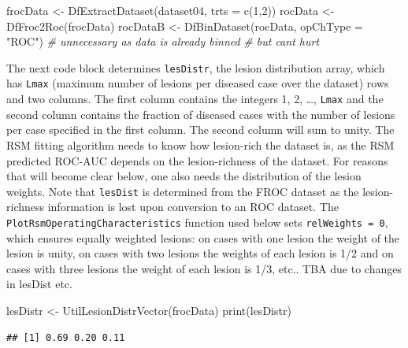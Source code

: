 \documentclass[
]{book}
\newenvironment{Shaded}{\begin{snugshade}}{\end{snugshade}}
\newcommand{\AttributeTok}[1]{\textcolor[rgb]{0.77,0.63,0.00}{#1}}
\newcommand{\CommentTok}[1]{\textcolor[rgb]{0.56,0.35,0.01}{\textit{#1}}}
\newcommand{\DecValTok}[1]{\textcolor[rgb]{0.00,0.00,0.81}{#1}}
\newcommand{\FunctionTok}[1]{\textcolor[rgb]{0.00,0.00,0.00}{#1}}
\newcommand{\NormalTok}[1]{#1}
\newcommand{\OtherTok}[1]{\textcolor[rgb]{0.56,0.35,0.01}{#1}}
\newcommand{\StringTok}[1]{\textcolor[rgb]{0.31,0.60,0.02}{#1}}
\begin{document}
\begin{Shaded}
\begin{Highlighting}[]
\NormalTok{frocData }\OtherTok{\textless{}{-}} \FunctionTok{DfExtractDataset}\NormalTok{(dataset04, }\AttributeTok{trts =} \FunctionTok{c}\NormalTok{(}\DecValTok{1}\NormalTok{,}\DecValTok{2}\NormalTok{))}
\NormalTok{rocData }\OtherTok{\textless{}{-}} \FunctionTok{DfFroc2Roc}\NormalTok{(frocData)}
\NormalTok{rocDataB }\OtherTok{\textless{}{-}} \FunctionTok{DfBinDataset}\NormalTok{(rocData, }\AttributeTok{opChType =} \StringTok{"ROC"}\NormalTok{) }\CommentTok{\# unnecessary as data is already binned}
\CommentTok{\# but cant hurt}
\end{Highlighting}
\end{Shaded}

The next code block determines \texttt{lesDistr}, the lesion distribution array, which has \texttt{Lmax} (maximum number of lesions per diseased case over the dataset) rows and two columns. The first column contains the integers 1, 2, \ldots, \texttt{Lmax} and the second column contains the fraction of diseased cases with the number of lesions per case specified in the first column. The second column will sum to unity. The RSM fitting algorithm needs to know how lesion-rich the dataset is, as the RSM predicted ROC-AUC depends on the lesion-richness of the dataset. For reasons that will become clear below, one also needs the distribution of the lesion weights. Note that \texttt{lesDist} is determined from the FROC dataset as the lesion-richness information is lost upon conversion to an ROC dataset. The \texttt{PlotRsmOperatingCharacteristics} function used below sets \texttt{relWeights\ =\ 0}, which ensures equally weighted lesions: on cases with one lesion the weight of the lesion is unity, on cases with two lesions the weights of each lesion is 1/2 and on cases with three lesions the weight of each lesion is 1/3, etc.. TBA due to changes in lesDist etc.

\begin{Shaded}
\begin{Highlighting}[]
\NormalTok{lesDistr }\OtherTok{\textless{}{-}} \FunctionTok{UtilLesionDistrVector}\NormalTok{(frocData)}
\FunctionTok{print}\NormalTok{(lesDistr)}
\end{Highlighting}
\end{Shaded}

\begin{verbatim}
## [1] 0.69 0.20 0.11
\end{verbatim}
\end{document}
